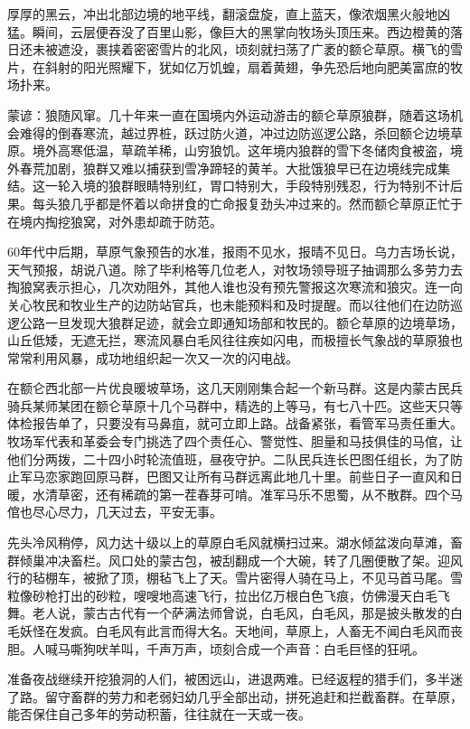\par 厚厚的黑云，冲出北部边境的地平线，翻滚盘旋，直上蓝天，像浓烟黑火般地凶猛。瞬间，云层便吞没了百里山影，像巨大的黑掌向牧场头顶压来。西边橙黄的落日还未被遮没，裹挟着密密雪片的北风，顷刻就扫荡了广袤的额仑草原。横飞的雪片，在斜射的阳光照耀下，犹如亿万饥蝗，扇着黄翅，争先恐后地向肥美富庶的牧场扑来。
\par 蒙谚：狼随风窜。几十年来一直在国境内外运动游击的额仑草原狼群，随着这场机会难得的倒春寒流，越过界桩，跃过防火道，冲过边防巡逻公路，杀回额仑边境草原。境外高寒低温，草疏羊稀，山穷狼饥。这年境内狼群的雪下冬储肉食被盗，境外春荒加剧，狼群又难以捕获到雪净蹄轻的黄羊。大批饿狼早已在边境线完成集结。这一轮入境的狼群眼睛特别红，胃口特别大，手段特别残忍，行为特别不计后果。每头狼几乎都是怀着以命拼食的亡命报复劲头冲过来的。然而额仑草原正忙于在境内掏挖狼窝，对外患却疏于防范。
\par 60年代中后期，草原气象预告的水准，报雨不见水，报晴不见日。乌力吉场长说，天气预报，胡说八道。除了毕利格等几位老人，对牧场领导班子抽调那么多劳力去掏狼窝表示担心，几次劝阻外，其他人谁也没有预先警报这次寒流和狼灾。连一向关心牧民和牧业生产的边防站官兵，也未能预料和及时提醒。而以往他们在边防巡逻公路一旦发现大狼群足迹，就会立即通知场部和牧民的。额仑草原的边境草场，山丘低矮，无遮无拦，寒流风暴白毛风往往疾如闪电，而极擅长气象战的草原狼也常常利用风暴，成功地组织起一次又一次的闪电战。
\par 在额仑西北部一片优良暖坡草场，这几天刚刚集合起一个新马群。这是内蒙古民兵骑兵某师某团在额仑草原十几个马群中，精选的上等马，有七八十匹。这些天只等体检报告单了，只要没有马鼻疽，就可立即上路。战备紧张，看管军马责任重大。牧场军代表和革委会专门挑选了四个责任心、警觉性、胆量和马技俱佳的马倌，让他们分两拨，二十四小时轮流值班，昼夜守护。二队民兵连长巴图任组长，为了防止军马恋家跑回原马群，巴图又让所有马群远离此地几十里。前些日子一直风和日暖，水清草密，还有稀疏的第一茬春芽可啃。准军马乐不思蜀，从不散群。四个马倌也尽心尽力，几天过去，平安无事。
\par 先头冷风稍停，风力达十级以上的草原白毛风就横扫过来。湖水倾盆泼向草滩，畜群倾巢冲决畜栏。风口处的蒙古包，被刮翻成一个大碗，转了几圈便散了架。迎风行的毡棚车，被掀了顶，棚毡飞上了天。雪片密得人骑在马上，不见马首马尾。雪粒像砂枪打出的砂粒，嗖嗖地高速飞行，拉出亿万根白色飞痕，仿佛漫天白毛飞舞。老人说，蒙古古代有一个萨满法师曾说，白毛风，白毛风，那是披头散发的白毛妖怪在发疯。白毛风有此言而得大名。天地间，草原上，人畜无不闻白毛风而丧胆。人喊马嘶狗吠羊叫，千声万声，顷刻合成一个声音：白毛巨怪的狂吼。
\par 准备夜战继续开挖狼洞的人们，被困远山，进退两难。已经返程的猎手们，多半迷了路。留守畜群的劳力和老弱妇幼几乎全部出动，拼死追赶和拦截畜群。在草原，能否保住自己多年的劳动积蓄，往往就在一天或一夜。
